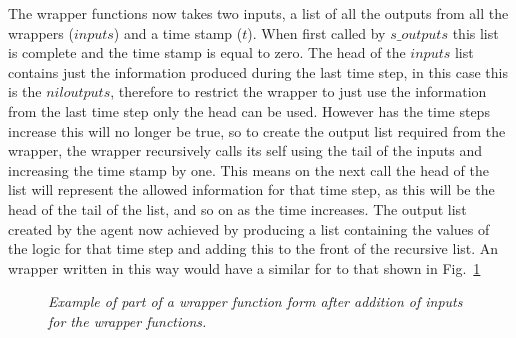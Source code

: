 \documentclass{article}
\begin{document}
The wrapper functions now takes two inputs, a list of all the outputs from all the wrappers ($inputs$) and a time stamp ($t$). When first called by $s\_outputs$ this list is complete and the time stamp is equal to zero. The head of the $inputs$ list contains just the information produced during the last time step, in this case this is the $niloutputs$, therefore to restrict the wrapper to just use the information from the last time step only the head can be used. However has the time steps increase this will no longer be true, so to create the output list required from the wrapper, the wrapper recursively calls its self using the tail of the inputs and increasing the time stamp by one. This means on the next call the head of the list will represent the allowed information for that time step, as this will be the head of the tail of the list, and so on as the time increases. The output list created by the agent now achieved by producing a list containing the values of the logic for that time step and adding this to the front of the recursive list. An wrapper written in this way would have a similar for to that shown in Fig.~\ref{fig:wrap4}
\begin{figure}[H]
	\centering
	
	\caption{\it Example of part of a wrapper function form after addition of inputs for the wrapper functions.}
	\label{fig:wrap4}
\end{figure} 
\end{document}
